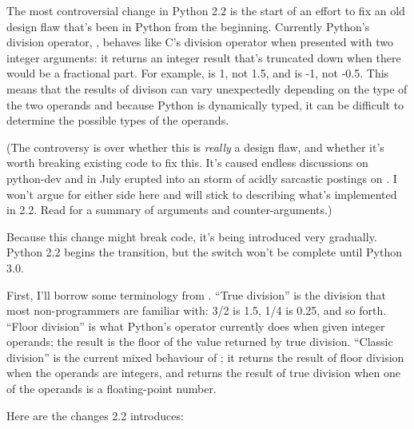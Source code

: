 \documentclass{howto}
\begin{document}
The most controversial change in Python 2.2 is the start of an effort
to fix an old design flaw that's been in Python from the beginning.
Currently Python's division operator, \code{/}, behaves like C's
division operator when presented with two integer arguments: it
returns an integer result that's truncated down when there would be
a fractional part.  For example,  is 1, not 1.5, and
 is -1, not -0.5.  This means that the results of divison
can vary unexpectedly depending on the type of the two operands and
because Python is dynamically typed, it can be difficult to determine
the possible types of the operands.

(The controversy is over whether this is \emph{really} a design flaw,
and whether it's worth breaking existing code to fix this.  It's
caused endless discussions on python-dev and in July erupted into an
storm of acidly sarcastic postings on . I
won't argue for either side here and will stick to describing what's 
implemented in 2.2.  Read  for a summary of arguments and
counter-arguments.)  

Because this change might break code, it's being introduced very
gradually.  Python 2.2 begins the transition, but the switch won't be
complete until Python 3.0.

First, I'll borrow some terminology from .  ``True division'' is the
division that most non-programmers are familiar with: 3/2 is 1.5, 1/4
is 0.25, and so forth.  ``Floor division'' is what Python's \code{/}
operator currently does when given integer operands; the result is the
floor of the value returned by true division.  ``Classic division'' is
the current mixed behaviour of \code{/}; it returns the result of
floor division when the operands are integers, and returns the result
of true division when one of the operands is a floating-point number.

Here are the changes 2.2 introduces:
\end{document}
